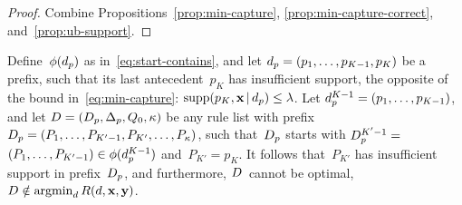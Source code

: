 \begin{proof}
Combine Propositions~\ref{prop:min-capture},
\ref{prop:min-capture-correct}, and~\ref{prop:ub-support}.
\end{proof}

\begin{proposition}
\label{prop:min-capture}
Define~$\phi(d_p)$ as in~\eqref{eq:start-contains},
and let ${d_p = (p_1, \dots, p_{K-1}, p_{K})}$ be a prefix,
such that its last antecedent~$p_{K}$ has insufficient support,
\ie the opposite of the bound in~\eqref{eq:min-capture}:
${\textnormal{supp}(p_K, \mathbf{x} \,|\, d_p) \le {\lambda}}$.
%
Let ${d_p^{K-1} = (p_1, \dots, p_{K-1})}$,
and let ${{D} = (D_p, \Delta_p, Q_0, \kappa)}$
be any rule list with prefix
${D_p = (P_1, \dots, P_{K'-1}, P_{K'}, \dots, P_{\kappa})}$,
such that~$D_p$ starts with ${D_p^{K'-1} =}$
${(P_1, \dots, P_{K'-1}) \in \phi(d_p^{K-1})}$
and~${P_{K'} = p_{K}}$.
%
It follows that~$P_{K'}$ has insufficient support in
prefix~$D_p$, and furthermore, ${D}$~cannot be optimal,
\ie ${{D} \notin \operatorname*{argmin}_{{d}} R({d}, \mathbf{x}, \mathbf{y})}$.
\end{proposition}

